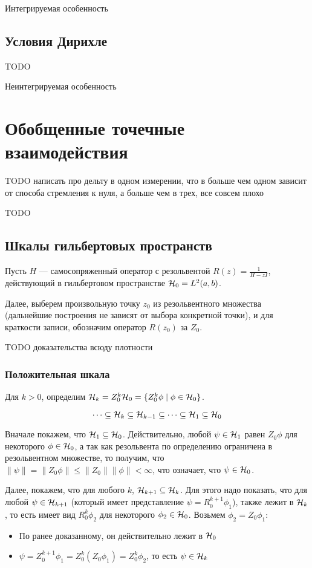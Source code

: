 Интегрируемая особенность
\subsection{Условия Дирихле}
TODO

Неинтегрируемая особенность

\section{Обобщенные точечные взаимодействия}

TODO написать про дельту в одном измерении, что в больше чем одном зависит от способа стремления к нуля, а больше чем в трех, все совсем плохо

TODO
\subsection{Шкалы гильбертовых пространств}
Пусть $H$ — самосопряженный оператор с резольвентой $R(z) = \frac{1}{H - z I}$, действующий в гильбертовом пространстве $\mathcal{H}_{0} = L^2(a, b)$.

Далее, выберем произвольную точку $z_0$ из резольвентного множества (дальнейшие построения не зависят от выбора конкретной точки), и для краткости записи, обозначим оператор $R(z_0)$ за $Z_0$.


TODO доказательства всюду плотности
\subsubsection{Положительная шкала}
Для $k > 0$, определим $\mathcal{H}_{k} = Z_0^k \mathcal{H}_{0} = \{ Z_0^k \phi \mid \phi \in \mathcal{H}_{0} \}$.

\begin{prop}
\[
\dots \subseteq \mathcal{H}_{k} \subseteq \mathcal{H}_{k - 1} \subseteq \dots \subseteq \mathcal{H}_{1} \subseteq{\mathcal{H}_{0}}
\]
\end{prop}
Вначале покажем, что $\mathcal{H}_{1} \subseteq \mathcal{H}_{0}$. Действительно, любой $\psi \in \mathcal{H}_{1}$ равен $Z_0 \phi$ для некоторого $\phi \in \mathcal{H}_{0}$, а так как резольвента по определению ограничена в резольвентном множестве, то получим, что $\| \psi \| = \| Z_0 \phi \| \le \|Z_0\| \|\phi\| < \infty$, что означает, что $\psi \in \mathcal{H}_{0}$.

Далее, покажем, что для любого $k$, $\mathcal{H}_{k + 1} \subseteq \mathcal{H}_{k}$. Для этого надо показать, что для любой $\psi \in \mathcal{H}_{k + 1}$ (который имеет представление $\psi = R_0^{k + 1} \phi_1$), также лежит в $\mathcal{H}_{k}$, то есть имеет вид $R_0^k \phi_2$ для некоторого $\phi_2 \in \mathcal{H}_{0}$. Возьмем $\phi_2 = Z_0 \phi_1$:
\begin{itemize}
\item По ранее доказанному, он действительно лежит в $\mathcal{H}_{0}$
\item $\psi = Z_0^{k + 1} \phi_1 = Z_0^k (Z_0 \phi_1) = Z_0^k \phi_2$, то есть $\psi \in \mathcal{H}_{k}$
\end{itemize}

